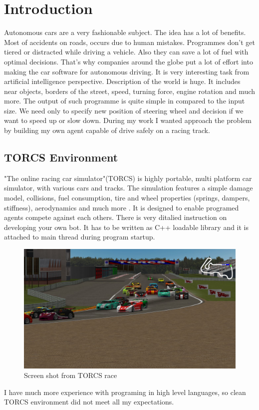 \documentclass[declaration,shortabstract,english,inz]{iithesis}
\author         {Kacper Kulczak}
\begin{document}

\chapter{Introduction}

Autonomous cars are a very fashionable subject. The idea has a lot of benefits. Most of accidents on roads, occurs due to human mistakes. Programmes don't get tiered or distracted while driving a vehicle. Also they can save a lot of fuel with optimal decisions.
That's why companies around the globe put a lot of effort into making the car software for autonomous driving. It is very interesting task from artificial intelligence perspective. Description of the world is huge. It includes near objects, borders of the street, speed, turning force, engine rotation and much more. The output of such programme is quite simple in compared to the input size. We need only to specify new position of steering wheel and decision if we want to speed up or slow down. During my work I wanted approach the problem by building my own agent capable of drive safely on a racing track.




\section{TORCS Environment}
"The online racing car simulator"(TORCS) is highly portable, multi platform car simulator, with various cars and tracks.  The simulation features a simple damage model, collisions, fuel consumption, tire and wheel properties (springs, dampers, stiffness), aerodynamics and much more \cite{TORCS}.  It is designed to enable programed agents compete against each others. There is very ditalied instruction on developing your  own bot. It has to be written as C++ loadable library and it is attached to main thread during program startup.


\begin{figure}[h]
    \includegraphics[width=\linewidth]{img/torcs_look.jpeg}
    \caption{Screen shot from TORCS race \cite{TORCS}}
    \label{fig:torcs}
\end{figure}
I have much more experience with programing in high level languages, so clean TORCS environment did not meet all my expectations. 
\end{document}
